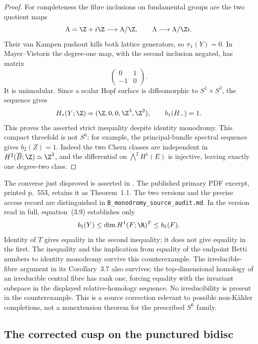 \begin{proof}
For completeness the fibre inclusions on fundamental groups
are the two quotient maps
\[
 \Lambda=\Z+i\Z\longrightarrow\Lambda/\Z,
 \qquad
 \Lambda\longrightarrow\Lambda/\Z i.
\]
Their van Kampen pushout kills both lattice generators, so
$\pi_1(Y)=0$.  In Mayer--Vietoris the degree-one map, with
the second inclusion negated, has matrix
\[
 \begin{pmatrix}0&1\\-1&0\end{pmatrix}.
\]
It is unimodular.  Since a scalar Hopf surface is diffeomorphic
to $S^1\times S^3$, the sequence gives
\[
 H_*(Y;\Z)=(\Z,0,0,\Z^3,\Z^2),\qquad b_1(H_-)=1.
\]
This proves the asserted strict inequality despite identity
monodromy.  This compact threefold is not $S^6$: for example,
the principal-bundle spectral sequence gives $b_2(Z)=1$.
Indeed the two Chern classes are independent in
$H^2(\overline B;\Z)\simeq\Z^3$, and the differential on
$\bigwedge^2H^1(E)$ is injective, leaving exactly one
degree-two class.
\end{proof}

\begin{remark}
The converse just disproved is asserted in
\citet[Theorems 1.2 and 3.2, arXiv version~1]{HondaViaclovsky2025D}.
The published primary PDF excerpt, printed p.~553,
retains it as Theorem~1.1.  The two versions and the precise
access record are distinguished in
\texttt{B\_monodromy\_source\_audit.md}.
In the version read in full, equation~(3.9) establishes only
\[
 b_1(Y)\leq\dim H^1(F;\R)^{T}\leq b_1(F).
\]
Identity of $T$ gives equality in the second inequality;
it does not give equality in the first.  The inequality and
the implication from equality of the endpoint Betti numbers
to identity monodromy survive this counterexample.
The irreducible-fibre argument in its Corollary~3.7 also
survives: the top-dimensional homology of an irreducible
central fibre has rank one, forcing equality with the
invariant subspace in the displayed relative-homology
sequence.  No irreducibility is present in the counterexample.
This is a source correction relevant to possible
non-K\"ahler completions, not a nonextension theorem for
the prescribed $S^6$ family.
\end{remark}

\subsection{The corrected cusp on the punctured bidisc}


